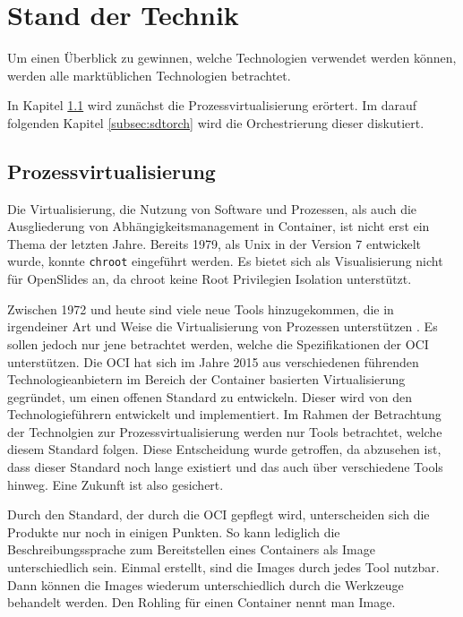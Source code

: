 \documentclass[11pt,a4paper]{article}
\begin{document}
\section{Stand der Technik}
\label{sec:sdt}
Um einen Überblick zu gewinnen, welche Technologien verwendet werden können, 
werden alle marktüblichen Technologien betrachtet.

In Kapitel \ref{subsec:sdtpv} wird zunächst die Prozessvirtualisierung 
erörtert. Im darauf folgenden Kapitel \ref{subsec:sdtorch} wird die 
Orchestrierung dieser diskutiert.
\subsection{Prozessvirtualisierung}
\label{subsec:sdtpv}
Die Virtualisierung, die Nutzung von Software und Prozessen, als auch die 
Ausgliederung von Abhängigkeitsmanagement in Container, ist nicht erst ein 
Thema der letzten Jahre. Bereits 1979, als Unix in der Version 7 entwickelt 
wurde, konnte \texttt{chroot} eingeführt werden. Es bietet sich als 
Visualisierung nicht für OpenSlides an, da chroot keine Root Privilegien 
Isolation unterstützt.\cite{containerhist}

Zwischen 1972 und heute sind viele neue Tools hinzugekommen, die in 
irgendeiner Art und Weise die Virtualisierung von Prozessen unterstützen 
\cite{containerhist}. Es sollen jedoch nur jene betrachtet werden, welche die 
Spezifikationen der \acf{OCI}\cite{oci} unterstützen. Die \ac{OCI} hat sich im 
Jahre 2015 aus verschiedenen führenden Technologieanbietern im Bereich der 
Container basierten Virtualisierung gegründet, um einen offenen Standard zu 
entwickeln. Dieser wird von den Technologieführern\cite{ocimembers} entwickelt 
und implementiert. Im Rahmen der Betrachtung der Technolgien zur 
Prozessvirtualisierung werden nur Tools betrachtet, welche diesem Standard 
folgen. Diese Entscheidung wurde getroffen, da abzusehen ist, dass dieser 
Standard noch lange existiert und das auch über verschiedene Tools hinweg. Eine 
Zukunft ist also gesichert.

Durch den Standard, der durch die \ac{OCI} gepflegt wird, unterscheiden sich 
die Produkte nur noch in einigen Punkten. So kann lediglich die 
Beschreibungssprache zum Bereitstellen eines Containers als Image 
unterschiedlich sein.  Einmal erstellt, sind die Images durch jedes Tool 
nutzbar. Dann können die Images wiederum unterschiedlich durch die Werkzeuge 
behandelt werden. Den \glqq{}Rohling\grqq{} für einen Container nennt man 
Image.
\end{document}
